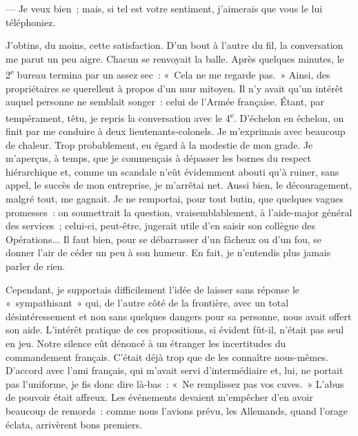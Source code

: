 \documentclass[french,twoside]{book} %
\begin{document}
— Je veux bien ; mais, si tel est votre sentiment, j’aimerais que vous le lui téléphoniez.\par
J’obtins, du moins, cette satisfaction. D’un bout à l’autre du fil, la conversation me parut un peu aigre. Chacun se renvoyait la balle. Après quelques minutes, le 2\textsuperscript{e} bureau termina par un assez sec : « Cela ne me regarde pas. » Ainsi, des propriétaires se querellent à propos d’un mur mitoyen. Il n’y avait qu’un intérêt auquel personne ne semblait songer : celui de l’Armée française. Étant, par tempérament, têtu, je repris la conversation avec le 4\textsuperscript{e}. D’échelon en échelon, on finit par me conduire à deux lieutenants-colonels. Je m’exprimais avec beaucoup de chaleur. Trop probablement, eu égard à la modestie de mon grade. Je m’aperçus, à temps, que je commençais à dépasser les bornes du respect hiérarchique et, comme un scandale n’eût évidemment abouti qu’à ruiner, sans appel, le succès de mon entreprise, je m’arrêtai net. Aussi bien, le découragement, malgré tout, me gagnait. Je ne remportai, pour tout butin, que quelques vagues promesses : on soumettrait la question, vraisemblablement, à l’aide-major général des services ; celui-ci, peut-être, jugerait utile d’en saisir son collègue des Opérations... Il faut bien, pour se débarrasser d’un fâcheux ou d’un fou, se donner l’air de céder un peu à son humeur. En fait, je n’entendis plus jamais parler de rien.\par
Cependant, je supportais difficilement l’idée de laisser sans réponse le « sympathisant » qui, de l’autre côté de la frontière, avec un total   désintéressement et non sans quelques dangers pour sa personne, nous avait offert son aide. L’intérêt pratique de ces propositions, si évident fût-il, n’était pas seul en jeu. Notre silence eût dénoncé à un étranger les incertitudes du commandement français. C’était déjà trop que de les connaître nous-mêmes. D’accord avec l’ami français, qui m’avait servi d’intermédiaire et, lui, ne portait pas l’uniforme, je fis donc dire là-bas : « Ne remplissez pas vos cuves. » L’abus de pouvoir était affreux. Les événements devaient m’empêcher d’en avoir beaucoup de remords : comme nous l’avions prévu, les Allemands, quand l’orage éclata, arrivèrent bons premiers.\par
\end{document}
